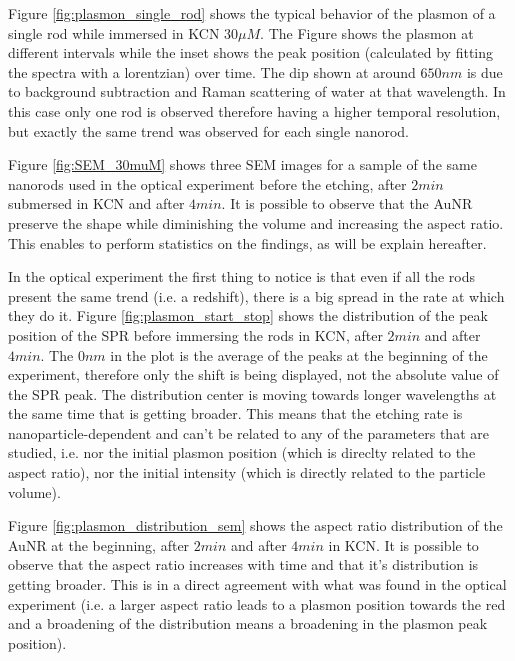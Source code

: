 \documentclass[twocolumn]{article}
\begin{document}
Figure \ref{fig:plasmon_single_rod} shows the typical behavior of the plasmon of
a single rod while immersed in KCN $30\mu M$. The Figure shows the plasmon at
different intervals while the inset shows the peak position (calculated by
fitting the spectra with a lorentzian) over time. The dip shown at around
$650nm$ is due to background subtraction and Raman scattering of water at that
wavelength. In this case only one rod is observed therefore having a higher
temporal resolution, but exactly the same trend was observed for each single
nanorod. 

Figure \ref{fig:SEM_30muM} shows three SEM images for a sample of the same
nanorods used in the optical experiment before the etching, after $2min$
submersed in KCN and after $4min$. It is possible to observe that the AuNR
preserve the shape while diminishing the volume and increasing the aspect ratio.
This enables to perform statistics on the findings, as will be explain
hereafter. 

In the optical experiment the first thing to notice is that even if all the rods
present the same trend (i.e. a redshift), there is a big spread in the rate at
which they do it. Figure \ref{fig:plasmon_start_stop} shows the distribution of
the peak position of the SPR before immersing the rods in KCN, after $2min$ and
after $4min$. The $0nm$ in the plot is the average of the peaks at the
beginning of the experiment, therefore only the shift is being displayed, not
the absolute value of the SPR peak. The distribution center is moving towards
longer wavelengths at the same time that is getting broader. This means that
the etching rate is nanoparticle-dependent and can't be related to any of the
parameters that are studied, i.e. nor the initial plasmon position (which
is direclty related to the aspect ratio), nor the initial intensity (which is
directly related to the particle volume). 

Figure \ref{fig:plasmon_distribution_sem} shows the aspect ratio distribution of
the AuNR at the beginning, after $2min$ and after $4min$ in KCN. It is possible
to observe that the aspect ratio increases with time and that it's distribution
is getting broader. This is in a direct agreement with what was found in the
optical experiment (i.e. a larger aspect ratio leads to a plasmon position
towards the red and a broadening of the distribution means a broadening in the
plasmon peak position). 
\end{document}
